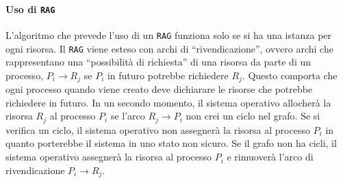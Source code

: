             \paragraph{Uso di \texttt{RAG}}
                L'algoritmo che prevede l'uso di un \texttt{RAG} funziona solo se si ha una istanza per ogni risorsa.\newline
                Il \texttt{RAG} viene esteso con archi di ``rivendicazione'', ovvero archi che rappresentano una ``possibilità di richiesta'' di una risorsa da parte di un processo, $P_i\rightarrow R_j$ se $P_i$ in futuro potrebbe richiedere $R_j$. Questo comporta che ogni processo quando viene creato deve dichiarare le risorse che potrebbe richiedere in futuro.\newline
                In un secondo momento, il sistema operativo allocherà la risorsa $R_j$ al processo $P_i$ se l'arco $R_j\rightarrow P_i$ non crei un ciclo nel grafo. Se si verifica un ciclo, il sistema operativo non assegnerà la risorsa al processo $P_i$ in quanto porterebbe il sistema in uno stato non sicuro. Se il grafo non ha cicli, il sistema operativo assegnerà la risorsa al processo $P_i$ e rimuoverà l'arco di rivendicazione $P_i\rightarrow R_j$.
